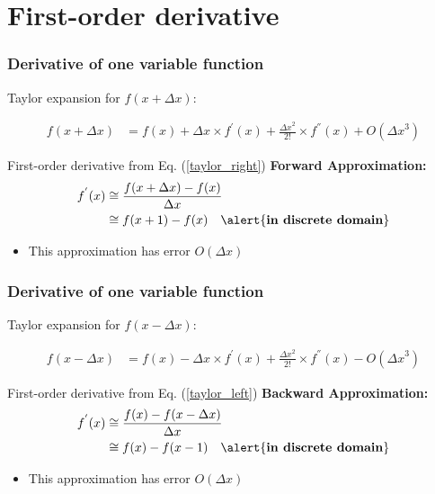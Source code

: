 \documentclass[english,11pt,table,handout]{beamer}
\begin{document}
\section{First-order derivative}
\frame
{
	\frametitle{Derivative of one variable function}
	Taylor expansion for $f(x + \Delta x)$:

	\begin{align} 
	\label{taylor_right}
	f(x + \Delta x) &= f(x) + \Delta x \times f^{'}(x) +\frac{{\Delta x}^2}{2!} \times f^{''}(x) + O({\Delta x}^3) 
	\end{align}

	
	\begin{block}{First-order derivative from Eq. (\ref{taylor_right})}
		\alert{\textbf{Forward Approximation:}} 
		\begin{equation*} 
		\begin{split}
		f^{'}(x) &\cong \frac{f(x+ \Delta x) - f(x)}{\Delta x}\\
				&\cong f(x+1) - f(x) \quad \text{\alert{\textbf{in discrete domain}}}
		\end{split}
		\end{equation*}
		\begin{itemize}
			\item This approximation has error $O({\Delta x})$ 
		\end{itemize}
	\end{block}
	
}
\frame
{
	\frametitle{Derivative of one variable function}
	Taylor expansion for $f(x - \Delta x)$:
	
	
	\begin{align}
	\label{taylor_left}
	f(x - \Delta x) &= f(x) - \Delta x \times f^{'}(x) +\frac{{\Delta x}^2}{2!} \times f^{''}(x) - O({\Delta x}^3) 
	\end{align}
	
	
	\begin{block}{First-order derivative from Eq. (\ref{taylor_left})}
		\alert{\textbf{Backward Approximation:}} 
		\begin{equation*} 
		\begin{split}
		f^{'}(x) &\cong \frac{f(x) - f(x- \Delta x)}{\Delta x}\\
				&\cong f(x) - f(x-1) \quad \text{\alert{\textbf{in discrete domain}}}
		\end{split}
		\end{equation*}
		\begin{itemize}
			\item This approximation has error $O({\Delta x})$ 
		\end{itemize}
	\end{block}
	
}
\end{document}
